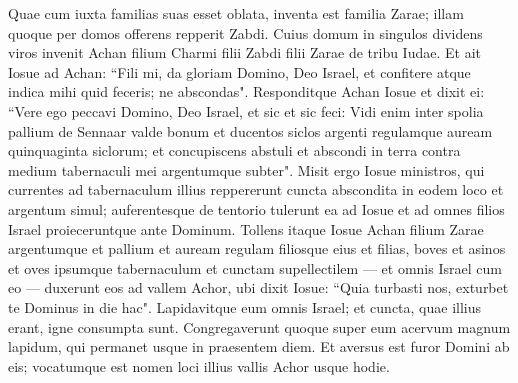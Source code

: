 \begin{biblechapter}
\verse Quae cum iuxta familias suas esset oblata, inventa est familia Zarae; illam quoque per domos offerens repperit Zabdi. 
\verse Cuius domum in singulos dividens viros invenit Achan filium Charmi filii Zabdi filii Zarae de tribu Iudae. 
\verse Et ait Iosue ad Achan: “Fili mi, da gloriam Domino, Deo Israel, et confitere atque indica mihi quid feceris; ne abscondas".  
\verse Responditque Achan Iosue et dixit ei: “Vere ego peccavi Domino, Deo Israel, et sic et sic feci: 
\verse Vidi enim inter spolia pallium de Sennaar valde bonum et ducentos siclos argenti regulamque auream quinquaginta siclorum; et concupiscens abstuli et abscondi in terra contra medium tabernaculi mei argentumque subter". 
\verse Misit ergo Iosue ministros, qui currentes ad tabernaculum illius reppererunt cuncta abscondita in eodem loco et argentum simul; 
\verse auferentesque de tentorio tulerunt ea ad Iosue et ad omnes filios Israel proieceruntque ante Dominum. 
\verse Tollens itaque Iosue Achan filium Zarae argentumque et pallium et auream regulam filiosque eius et filias, boves et asinos et oves ipsumque tabernaculum et cunctam supellectilem — et omnis Israel cum eo — duxerunt eos ad vallem Achor, 
\verse ubi dixit Iosue: “Quia turbasti nos, exturbet te Dominus in die hac". Lapidavitque eum omnis Israel; et cuncta, quae illius erant, igne consumpta sunt. 
\verse Congregaverunt quoque super eum acervum magnum lapidum, qui permanet usque in praesentem diem. Et aversus est furor Domini ab eis; vocatumque est nomen loci illius vallis Achor usque hodie. 
\end{biblechapter}

